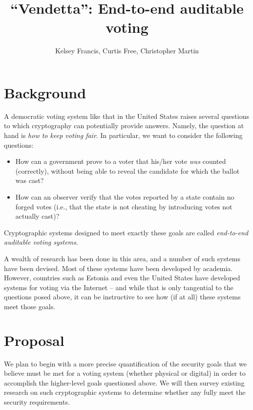\documentclass[9pt]{article}
\title{``Vendetta'': End-to-end auditable voting}
\date{}
\author{Kelsey Francis, Curtis Free, Christopher Martin}
\newcommand{\term}[1]{\textit{#1}}
\begin{document}
	\maketitle

	\section{Background}

		A democratic voting system like that in the United States raises several questions to which
		cryptography can potentially provide answers. Namely, the question at hand is \emph{how to keep
		voting fair}. In particular, we want to consider the following questions:
		\begin{itemize}

			\item
				How can a government prove to a voter that his/her vote \emph{was} counted (correctly),
				without being able to reveal the candidate for which the ballot was cast?

			\item
				How can an observer verify that the votes reported by a state contain no forged votes (i.e.,
				that the state is not cheating by introducing votes not actually cast)?

		\end{itemize}
		Cryptographic systems designed to meet exactly these goals are called \term{end-to-end auditable
		voting systems}\cite{end_to_end}.

		A wealth of research has been done in this area, and a number of such systems have been devised.
		Most of these systems have been developed by academia. However, countries such as Estonia and
		even the United States have developed systems for voting via the Internet
		\cite{estonia,us_vs_est} -- and while that is only tangential to the questions posed above, it
		can be instructive to see how (if at all) these systems meet those goals.

	\section{Proposal}

		We plan to begin with a more precise quantification of the security goals that we believe must
		be met for a voting system (whether physical or digital) in order to accomplish the higher-level
		goals questioned above. We will then survey existing research on such cryptographic systems to
		determine whether any fully meet the security requirements.
\end{document}
